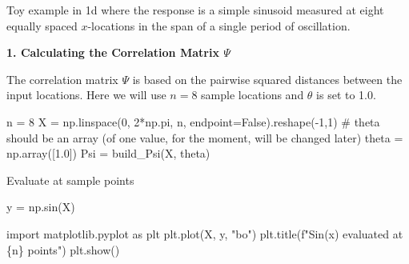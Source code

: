 \documentclass[
  letterpaper,
  DIV=11,
  numbers=noendperiod]{scrreprt}
\newenvironment{Shaded}{\begin{snugshade}}{\end{snugshade}}
\newcommand{\CommentTok}[1]{\textcolor[rgb]{0.37,0.37,0.37}{#1}}
\newcommand{\DecValTok}[1]{\textcolor[rgb]{0.68,0.00,0.00}{#1}}
\newcommand{\FloatTok}[1]{\textcolor[rgb]{0.68,0.00,0.00}{#1}}
\newcommand{\ImportTok}[1]{\textcolor[rgb]{0.00,0.46,0.62}{#1}}
\newcommand{\NormalTok}[1]{\textcolor[rgb]{0.00,0.23,0.31}{#1}}
\newcommand{\OperatorTok}[1]{\textcolor[rgb]{0.37,0.37,0.37}{#1}}
\newcommand{\SpecialCharTok}[1]{\textcolor[rgb]{0.37,0.37,0.37}{#1}}
\newcommand{\SpecialStringTok}[1]{\textcolor[rgb]{0.13,0.47,0.30}{#1}}
\newcommand{\StringTok}[1]{\textcolor[rgb]{0.13,0.47,0.30}{#1}}
\newcommand{\VariableTok}[1]{\textcolor[rgb]{0.07,0.07,0.07}{#1}}
\begin{document}
\begin{tcolorbox}[enhanced jigsaw, opacityback=0, left=2mm, title=\textcolor{quarto-callout-note-color}{\faInfo}\hspace{0.5em}{Example: Sinusoid Function}, bottomrule=.15mm, titlerule=0mm, arc=.35mm, leftrule=.75mm, colbacktitle=quarto-callout-note-color!10!white, bottomtitle=1mm, opacitybacktitle=0.6, coltitle=black, colframe=quarto-callout-note-color-frame, toprule=.15mm, breakable, colback=white, toptitle=1mm, rightrule=.15mm]

Toy example in 1d where the response is a simple sinusoid measured at
eight equally spaced \(x\)-locations in the span of a single period of
oscillation.

\textbf{1. Calculating the Correlation Matrix \(\Psi\)}

The correlation matrix \(\Psi\) is based on the pairwise squared
distances between the input locations. Here we will use \(n=8\) sample
locations and \(\theta\) is set to 1.0.

\begin{Shaded}
\begin{Highlighting}[]
\NormalTok{n }\OperatorTok{=} \DecValTok{8}
\NormalTok{X }\OperatorTok{=}\NormalTok{ np.linspace(}\DecValTok{0}\NormalTok{, }\DecValTok{2}\OperatorTok{*}\NormalTok{np.pi, n, endpoint}\OperatorTok{=}\VariableTok{False}\NormalTok{).reshape(}\OperatorTok{{-}}\DecValTok{1}\NormalTok{,}\DecValTok{1}\NormalTok{)}
\CommentTok{\# theta should be an array (of one value, for the moment, will be changed later)}
\NormalTok{theta }\OperatorTok{=}\NormalTok{ np.array([}\FloatTok{1.0}\NormalTok{])}
\NormalTok{Psi }\OperatorTok{=}\NormalTok{ build\_Psi(X, theta)}
\end{Highlighting}
\end{Shaded}

Evaluate at sample points

\begin{Shaded}
\begin{Highlighting}[]
\NormalTok{y }\OperatorTok{=}\NormalTok{ np.sin(X)}
\end{Highlighting}
\end{Shaded}

\begin{Shaded}
\begin{Highlighting}[]
\ImportTok{import}\NormalTok{ matplotlib.pyplot }\ImportTok{as}\NormalTok{ plt}
\NormalTok{plt.plot(X, y, }\StringTok{"bo"}\NormalTok{)}
\NormalTok{plt.title(}\SpecialStringTok{f"Sin(x) evaluated at }\SpecialCharTok{\{}\NormalTok{n}\SpecialCharTok{\}}\SpecialStringTok{ points"}\NormalTok{)}
\NormalTok{plt.show()}
\end{Highlighting}
\end{Shaded}


\end{tcolorbox}
\end{document}
